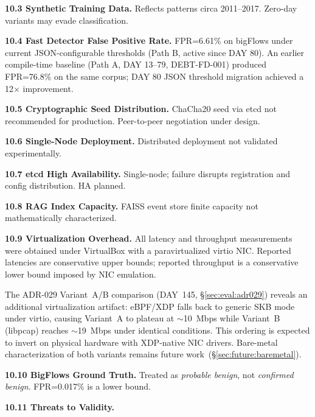 \documentclass[11pt,a4paper]{article}
\begin{document}
    \textbf{10.3 Synthetic Training Data.} Reflects patterns circa 2011--2017. Zero-day
    variants may evade classification.

    \textbf{10.4 Fast Detector False Positive Rate.} FPR=6.61\% on bigFlows under current
    JSON-configurable thresholds (Path B, active since DAY 80). An earlier compile-time baseline
    (Path A, DAY 13--79, DEBT-FD-001) produced FPR=76.8\% on the same corpus; DAY 80 JSON
    threshold migration achieved a 12$\times$ improvement.

    \textbf{10.5 Cryptographic Seed Distribution.} ChaCha20 seed via etcd not recommended for
    production. Peer-to-peer negotiation under design.

    \textbf{10.6 Single-Node Deployment.} Distributed deployment not validated
    experimentally.

    \textbf{10.7 etcd High Availability.} Single-node; failure disrupts registration and config
    distribution. HA planned.

    \textbf{10.8 RAG Index Capacity.} FAISS event store finite capacity not mathematically
    characterized.

    \textbf{10.9 Virtualization Overhead.}
    All latency and throughput measurements were obtained under VirtualBox
    with a paravirtualized virtio NIC. Reported latencies are conservative
    upper bounds; reported throughput is a conservative lower bound imposed
    by NIC emulation.

    The ADR-029 Variant~A/B comparison (DAY~145,
    \S\ref{sec:eval:adr029}) reveals an additional virtualization artifact:
    eBPF/XDP falls back to generic SKB mode under virtio, causing
    Variant~A to plateau at ${\sim}$10~Mbps while Variant~B (libpcap)
    reaches ${\sim}$19~Mbps under identical conditions. This ordering is
    expected to invert on physical hardware with XDP-native NIC drivers.
    Bare-metal characterization of both variants remains future
    work~(\S\ref{sec:future:baremetal}).

    \textbf{10.10 BigFlows Ground Truth.} Treated as \emph{probable benign}, not
    \emph{confirmed benign}. FPR=0.017\% is a lower bound.

    \textbf{10.11 Threats to Validity.}
\end{document}
